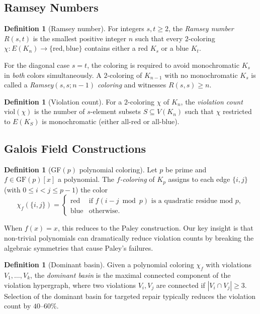 \documentclass[12pt,a4paper]{article}
\theoremstyle{definition}
\newtheorem{definition}[theorem]{Definition}
\theoremstyle{remark}
\newcommand{\GF}[1]{\mathrm{GF}(#1)}
\newcommand{\Kn}[1]{K_{#1}}
\newcommand{\Rnum}[2]{R(#1,#2)}
\newcommand{\viol}{\mathrm{viol}}
\begin{document}
\subsection{Ramsey Numbers}

\begin{definition}[Ramsey number]\label{def:ramsey}
For integers $s, t \ge 2$, the \emph{Ramsey number} $\Rnum{s}{t}$ is the smallest positive integer $n$ such that every $2$-coloring $\chi : E(\Kn{n}) \to \{\text{red}, \text{blue}\}$ contains either a red $K_s$ or a blue $K_t$.
\end{definition}

For the diagonal case $s = t$, the coloring is required to avoid monochromatic $K_s$ in \emph{both} colors simultaneously.  A $2$-coloring of $\Kn{n-1}$ with no monochromatic $K_s$ is called a \emph{Ramsey$(s,s;n-1)$ coloring} and witnesses $\Rnum{s}{s} \ge n$.

\begin{definition}[Violation count]\label{def:viol}
For a $2$-coloring $\chi$ of $\Kn{n}$, the \emph{violation count} $\viol(\chi)$ is the number of $s$-element subsets $S \subseteq V(\Kn{n})$ such that $\chi$ restricted to $E(K_S)$ is monochromatic (either all-red or all-blue).
\end{definition}

\subsection{Galois Field Constructions}

\begin{definition}[GF$(p)$ polynomial coloring]\label{def:gfpoly}
Let $p$ be prime and $f \in \GF{p}[x]$ a polynomial.  The \emph{$f$-coloring} of $\Kn{p}$ assigns to each edge $\{i, j\}$ (with $0 \le i < j \le p-1$) the color
\[
\chi_f(\{i,j\}) = \begin{cases}
\text{red} & \text{if } f(i-j \bmod p) \text{ is a quadratic residue mod } p, \\
\text{blue} & \text{otherwise}.
\end{cases}
\]
\end{definition}

When $f(x) = x$, this reduces to the Paley construction.  Our key insight is that non-trivial polynomials can dramatically reduce violation counts by breaking the algebraic symmetries that cause Paley's failures.

\begin{definition}[Dominant basin]\label{def:basin}
Given a polynomial coloring $\chi_f$ with violations $V_1, \ldots, V_k$, the \emph{dominant basin} is the maximal connected component of the violation hypergraph, where two violations $V_i, V_j$ are connected if $|V_i \cap V_j| \ge 3$.  Selection of the dominant basin for targeted repair typically reduces the violation count by $40$--$60\%$.
\end{definition}
\end{document}
